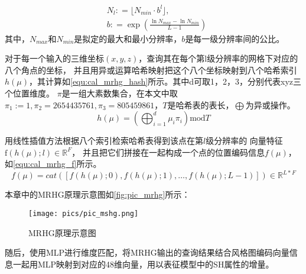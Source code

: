 \begin{equation}
    \label{equ:cal_mrhg_res}
    \begin{aligned}&N_l{:}=\lfloor N_{min}\cdot b^l\rfloor,\\&b{:}=\exp{(\frac{\ln N_{max}-\ln N_{min}}{L-1})}\end{aligned}
\end{equation}
其中，\(N_{max}\)和\(N_{min}\)是拟定的最大和最小分辨率，$b$是每一级分辨率间的公比。
\par 对于每一个输入的三维坐标$(x,y,z)$，查询其在每个第l级分辨率的网格下对应的八个角点的坐标，
并且用异或运算哈希映射把这个八个坐标映射到八个哈希索引$h(\mu)$，其计算如\autoref{equ:cal_mrhg_hash}所示。其中d可取1，2，3，分别代表xyz三个位置维度。
$\pi$是一组大素数集合，在本文中取\(\pi_{1}:=1,\pi_2=2654435761,\pi_3=805459861\)，$T$是哈希表的表长，$\bigoplus $为异或操作。
\begin{equation}
    \label{equ:cal_mrhg_hash}
    h(\mu)=\left(\bigoplus_{i=1}^d\mu_i\pi_i\right)\mathrm{mod}T
\end{equation}
\par 用线性插值方法根据八个索引检索哈希表得到该点在第$l$级分辨率的
向量特征\(\mathrm{f}(h(\mu);l)
\in\mathbb{R}^F\)，
并且把它们拼接在一起构成一个点的位置编码信息\(f(\mu)\)，
如\autoref{equ:cal_mrhg_f}所示。
\begin{equation}
    \label{equ:cal_mrhg_f}
    f(\mu)=cat([f(h(\mu);0),f(h(\mu);1),\ldots,f(h(\mu);L-1)])\in\mathbb{R}^{L*F}
\end{equation}


本章中的MRHG原理示意图如\autoref{fig:pic_mrhg}所示：

\begin{figure}[htb]
    \centering
    \texttt{[image: pics/pic\_mshg.png]}
    \caption{\label{fig:pic_mrhg}MRHG原理示意图}
\end{figure}




随后，使用MLP进行维度匹配，将MRHG输出的查询结果结合风格图编码向量信息一起用MLP映射到对应的48维向量，用以表征模型中的SH属性的增量。

